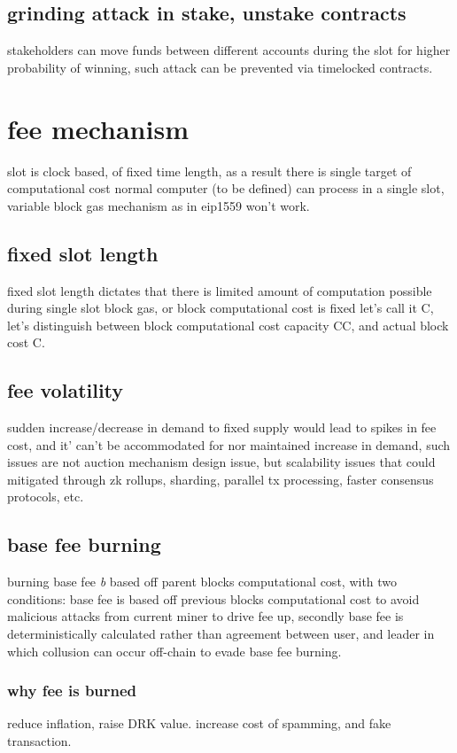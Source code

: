 \documentclass{article}
\begin{document}
\label{timelocked}
\subsection {grinding attack in stake, unstake contracts}
stakeholders can move funds between different accounts during the slot for higher probability of winning, such attack can be prevented via timelocked contracts.


\section {fee mechanism}
slot is clock based, of fixed time length, as a result there is single target of computational cost normal computer (to be defined) can process in a single slot, variable block gas mechanism as in eip1559 won't work.

\subsection{ fixed slot length}
fixed slot length dictates that there is limited amount of computation possible during single slot block gas, or block computational cost is fixed let's call it C, let's distinguish between block computational cost capacity CC, and actual block cost C.

\subsection{fee volatility}
sudden increase/decrease in demand to fixed supply would lead to spikes in fee cost, and it' can't be accommodated for nor maintained increase in demand, such issues are not auction mechanism design issue, but scalability issues that could mitigated through zk rollups, sharding, parallel tx processing, faster consensus protocols, etc.

\subsection{ base fee burning}
burning base fee \emph{b} based off parent blocks computational cost, with two conditions: base fee is based off previous blocks computational cost to avoid malicious attacks from current miner to drive fee up, secondly base fee is deterministically calculated rather than agreement between user, and leader in which collusion can occur off-chain to evade base fee burning.

\subsubsection{ why fee is burned}
reduce inflation, raise DRK value.
increase cost of spamming, and fake transaction.
\end{document}
